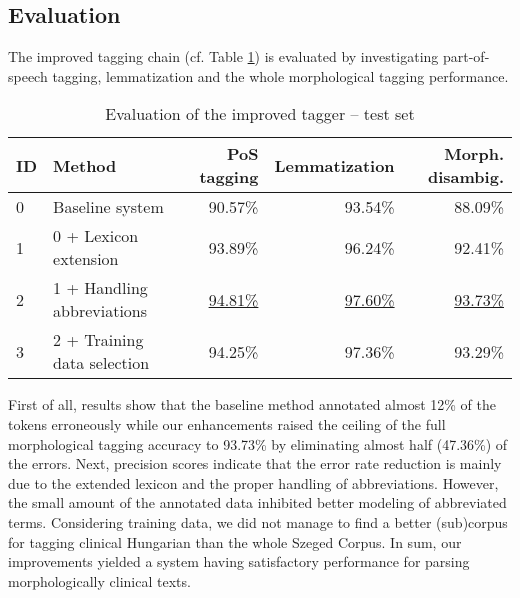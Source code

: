 \subsection{Evaluation}

The improved tagging chain (cf. Table \ref{tab:improvements}) is evaluated by investigating part-of-speech tagging, lemmatization and the whole morphological tagging performance.%

\begin{table}[h]
\centering
\caption{Evaluation of the improved tagger -- test set}
\label{tab:improvements}
\begin{tabular}{ l l r r r} 
\hline
ID & Method & PoS tagging & Lemmatization & Morph. disambig. \\
\hline
0 & Baseline system & 90.57\% & 93.54\% & 88.09\% \\
1 & 0 + Lexicon extension & 93.89\% & 96.24\% & 92.41\% \\
2 & 1 + Handling abbreviations & \underline{94.81\%} & \underline{97.60\%} & \underline{93.73\%} \\
3 & 2 + Training data selection & 94.25\% & 97.36\% & 93.29\% \\
\hline
\end{tabular}
\end{table}

First of all, results show that the baseline method annotated almost 12\% of the tokens erroneously while our enhancements raised the ceiling of the full morphological tagging accuracy to 93.73\% by eliminating almost half (47.36\%) of the errors. 
Next, precision scores indicate that the error rate reduction is mainly due to the extended lexicon and the proper handling of abbreviations. 
However, the small amount of the annotated data inhibited better modeling of abbreviated terms.
Considering training data, we did not manage to find a better (sub)corpus for tagging clinical Hungarian than the whole Szeged Corpus.%
In sum, our improvements yielded a system having satisfactory performance for parsing morphologically clinical texts.

